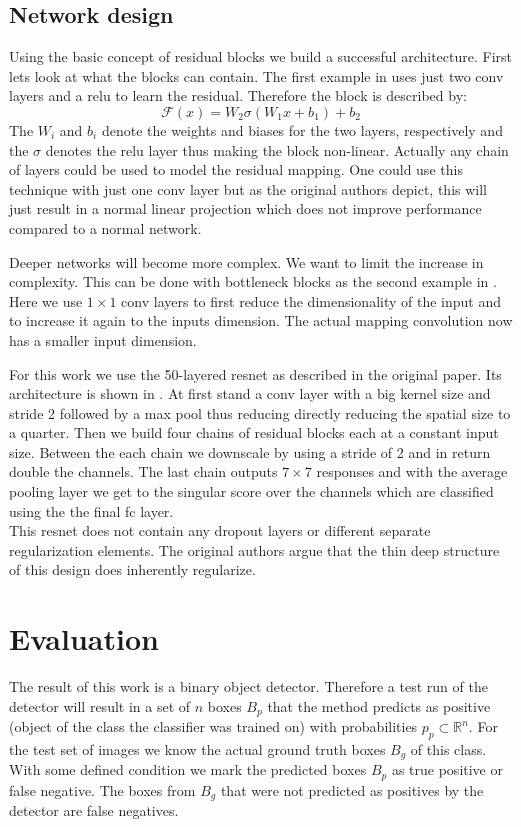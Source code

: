 \subsection{Network design}
\label{sec:concepts:resnet:design}
Using the basic concept of residual blocks we build a successful architecture. First lets look at what the blocks can contain. The first example in  uses just two \gls{conv} layers and a \gls{relu} to learn the residual. Therefore the block is described by:
\begin{equation}
    \mathcal{F}(x) = W_2\sigma(W_1 x + b_1) + b_2
\end{equation}
The $W_i$ and $b_i$ denote the weights and biases for the two layers, respectively and the $\sigma$ denotes the \gls{relu} layer thus making the block non-linear. Actually any chain of layers could be used to model the residual mapping. One could use this technique with just one \gls{conv} layer but as the original authors \citep{he_deep_2016} depict, this will just result in a normal linear projection which does not improve performance compared to a normal network.

Deeper networks will become more complex. We want to limit the increase in complexity. This can be done with bottleneck blocks as the second example in . Here we use $1\times1$ \gls{conv} layers to first reduce the dimensionality of the input and to increase it again to the inputs dimension. The actual mapping convolution now has a smaller input dimension.

For this work we use the 50-layered \gls{resnet} as described in the original paper. Its architecture is shown in . At first stand a \gls{conv} layer with a big kernel size and stride 2 followed by a max pool thus reducing directly reducing the spatial size to a quarter. Then we build four chains of residual blocks each at a constant input size. Between the each chain we downscale by using a stride of 2 and in return double the channels. The last chain outputs $7 \times 7$ responses and with the average pooling layer we get to the singular score over the channels which are classified using the the final \gls{fc} layer.\\
This \gls{resnet} does not contain any dropout layers or different separate regularization elements. The original authors argue that the thin deep structure of this design does inherently regularize.


\clearpage
\section{Evaluation}
\label{sec:concepts:eval}
The result of this work is a binary object detector. Therefore a test run of the detector will result in a set of $n$ boxes $B_p$ that the method predicts as positive (object of the class the classifier was trained on) with probabilities $p_p \subset \mathbb{R}^n$. For the test set of images we know the actual ground truth boxes $B_g$ of this class. With some defined condition we mark the predicted boxes $B_p$ as true positive or false negative. The boxes from $B_g$ that were not predicted as positives by the detector are false negatives.

